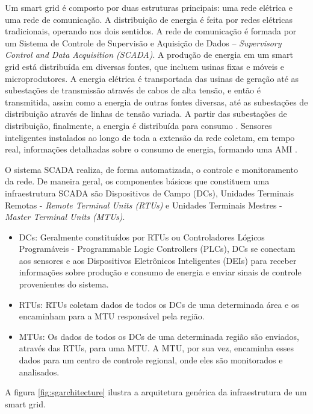 \documentclass[12pt]{article}
\begin{document}
	Um smart grid é composto por duas estruturas principais: uma rede elétrica e uma rede de comunicação. A distribuição de energia é feita por redes elétricas tradicionais, operando nos dois sentidos. A rede de comunicação é formada por um Sistema de Controle de Supervisão e Aquisição de Dados – \textit{Supervisory Control and Data Acquisition (SCADA)}.
A produção de energia em um smart grid está distribuída em diversas fontes, que incluem usinas fixas e móveis e microprodutores. A energia elétrica é transportada das usinas de geração até as subestações de transmissão através de cabos de alta tensão, e então é transmitida, assim como a energia de outras fontes diversas, até as subestações de distribuição através de linhas de tensão variada. A partir das subestações de distribuição, finalmente, a energia é distribuída para consumo \cite{harb2013communication}. Sensores inteligentes instalados ao longo de toda a extensão da rede coletam, em tempo real, informações detalhadas sobre o consumo de energia, formando uma AMI \cite{2013survey}.

O sistema SCADA realiza, de forma automatizada, o controle e monitoramento da rede. De maneira geral, os componentes básicos que constituem uma infraestrutura SCADA são Dispositivos de Campo (DCs), Unidades Terminais Remotas - \emph{Remote Terminal Units (RTUs)} e Unidades Terminais Mestres - \emph{Master Terminal Units (MTUs)}.

\begin{itemize}

\item{DCs}: Geralmente constituídos por RTUs ou Controladores Lógicos Programáveis - Programmable Logic Controllers (PLCs), DCs se conectam aos sensores e aos Dispositivos Eletrônicos Inteligentes (DEIs) para receber informações sobre produção e consumo de energia e enviar sinais de controle provenientes do sistema.
\item{RTUs}: RTUs  coletam dados de todos os DCs de uma determinada área e os encaminham para a MTU responsável pela região.
\item{MTUs}: Os dados de todos os DCs de uma determinada região são enviados, através das RTUs, para uma MTU. A MTU, por sua vez, encaminha esses dados para um centro de controle regional, onde eles são monitorados e analisados.
\end{itemize}
A figura \ref{fig:sgarchitecture} ilustra a arquitetura genérica da infraestrutura de um smart grid.
\end{document}
